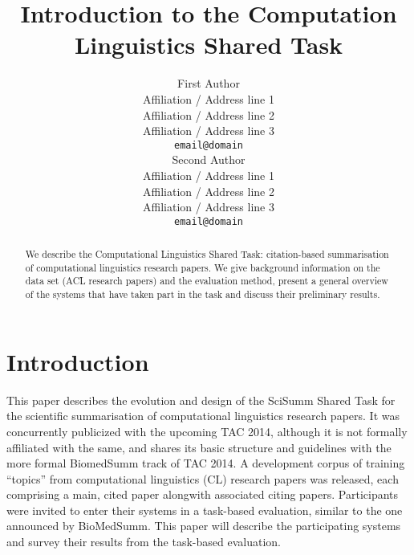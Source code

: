 \documentclass[11pt]{article}
\title{Introduction to the Computation Linguistics Shared Task}
\author{First Author \\
  Affiliation / Address line 1 \\
  Affiliation / Address line 2 \\
  Affiliation / Address line 3 \\
  {\tt email@domain} \\\And
  Second Author \\
  Affiliation / Address line 1 \\
  Affiliation / Address line 2 \\
  Affiliation / Address line 3 \\
  {\tt email@domain} \\}
\date{}
\begin{document}
\maketitle
\begin{abstract}
We describe the Computational Linguistics Shared Task: citation-based summarisation of computational linguistics research papers. We give background information on the data set (ACL research papers) and the evaluation method, present a general overview of the systems that have taken part in the task and discuss their preliminary results.
\end{abstract}

\section{Introduction}
This paper describes the evolution and design of the SciSumm Shared Task for the scientific summarisation of computational linguistics research papers. It was concurrently publicized with the upcoming TAC 2014, although it is not formally affiliated with the same, and shares its basic structure and guidelines with the more formal BiomedSumm track of TAC 2014. A development corpus of training “topics” from computational linguistics (CL) research papers was released, each comprising a main, cited paper alongwith associated citing papers. Participants were invited to enter their systems in a task-based evaluation, similar to the one announced by BioMedSumm.
This paper will describe the participating systems and survey their results from the task-based evaluation.
\end{document}
